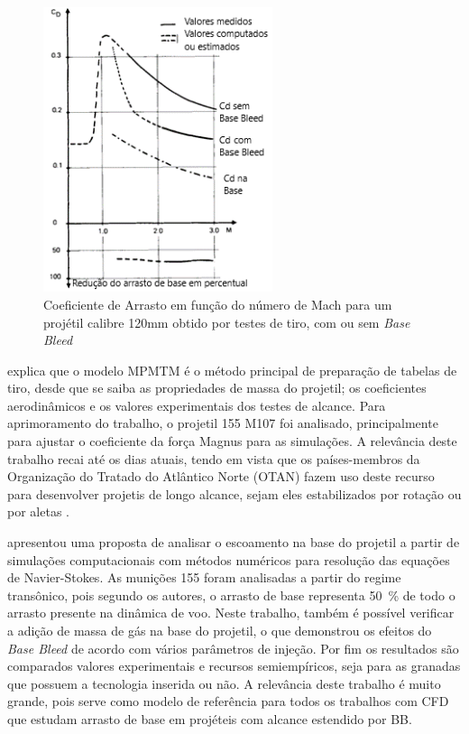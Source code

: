 \begin{figure}[!ht]
	\centering
    \includegraphics[width=0.6\textwidth]{foto05-grafico2-andersson1976.png}
	\caption[Coeficiente de Arrasto em função do número de Mach para um projétil calibre 120mm obtido por testes de tiro, com ou sem \textit{Base Bleed}.]{Coeficiente de Arrasto em função do número de Mach para um projétil calibre 120mm obtido por testes de tiro, com ou sem \textit{Base Bleed} \cite{Andersson1976}}
	\label{fig5:andersson1976}
\end{figure}

\citeauthor{Lieske1966} explica que o modelo MPMTM é o método principal de preparação de tabelas de tiro, desde que se saiba as propriedades de massa do projetil; os coeficientes aerodinâmicos e os valores experimentais dos testes de alcance. Para aprimoramento do trabalho, o projetil \qty{155}{\millimetre} M107 foi analisado, principalmente para ajustar o coeficiente da força Magnus para as simulações. A relevância deste trabalho recai até os dias atuais, tendo em vista que os países-membros da Organização do Tratado do Atlântico Norte (OTAN) fazem uso deste recurso para desenvolver projetis de longo alcance, sejam eles estabilizados por rotação ou por aletas \cite{stanag4355}.

\citeauthor{Sahu1985} apresentou uma proposta de analisar o escoamento na base do projetil a partir de simulações computacionais com métodos numéricos para resolução das equações de Navier-Stokes. As munições \qty{155}{\millimetre} foram analisadas a partir do regime transônico, pois segundo os autores, o arrasto de base representa \qty{50}{\percent} de todo o arrasto presente na dinâmica de voo. Neste trabalho, também é possível verificar a adição de massa de gás na base do projetil, o que demonstrou os efeitos do \textit{Base Bleed} de acordo com vários parâmetros de injeção. Por fim os resultados são comparados valores experimentais e recursos semiempíricos, seja para as granadas que possuem a tecnologia inserida ou não. A relevância deste trabalho é muito grande, pois serve como modelo de referência para todos os trabalhos com CFD que estudam arrasto de base em projéteis com alcance estendido por BB.

